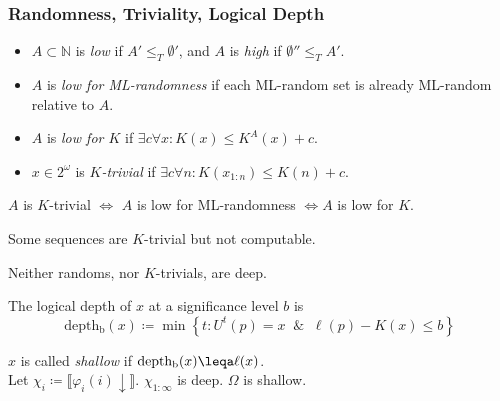 \documentclass[UTF8,11pt,colorlinks,compress,openany]{beamer}%
\begin{document}
\begin{frame}\frametitle{Randomness, Triviality, Logical Depth}
\setlength\abovedisplayskip{0pt}
\setlength\belowdisplayskip{0pt}
\begin{itemize}
\item $A\subset\mathbb{N}$ is \emph{low} if $A'\leq_T\emptyset'$, and $A$ is \emph{high} if $\emptyset''\leq_T A'$.
\item $A$ is \emph{low for ML-randomness} if each ML-random set is already ML-random relative to $A$.
\item $A$ is \emph{low for $K$} if $\exists c\forall x: K(x)\leq K^A(x)+c$.
\item $x\in 2^\omega$ is \emph{$K$-trivial} if $\exists c\forall n: K(x_{1:n})\leq K(n)+c$.
\end{itemize}
\begin{theorem}
$A$ is $K$-trivial $\iff$ $A$ is low for ML-randomness $\iff A$ is low for $K$.
\end{theorem}
Some sequences are $K$-trivial but not computable.

Neither randoms, nor $K$-trivials, are deep.
\begin{definition}
The logical depth of $x$ at a significance level $b$ is
\[\operatorname{depth_b}(x)\coloneqq \min\left\{t: U^t(p)=x\;\;\&\;\;\ell(p)-K(x)\leq b\right\}\]
\end{definition}
$x$ is called \emph{shallow} if $\operatorname{depth_b}(x)\leqa\ell(x)$.\\
Let $\chi_i\coloneqq \llbracket\varphi_i(i)\downarrow\rrbracket$. $\chi_{1:\infty}$ is deep. $\Omega$ is shallow.
\end{frame}
\end{document}
